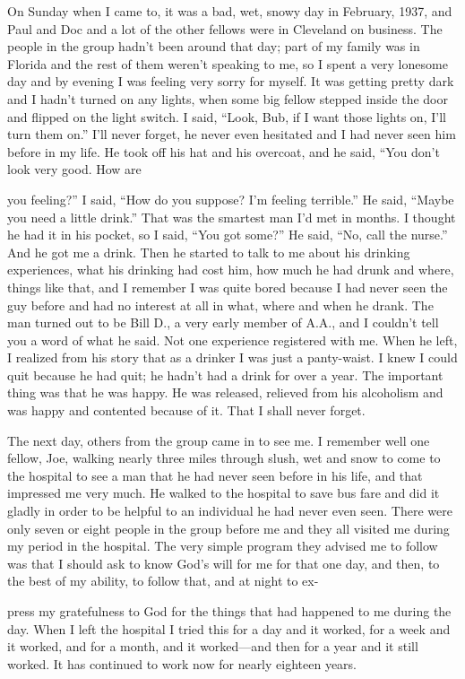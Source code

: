 \begin{biblechapter}
On Sunday when I came to, it was a bad, wet, snowy day in February, 1937, and Paul and Doc and a lot of the other fellows were in Cleveland on business. The people in the group hadn’t been around that day; part of my family was in Florida and the rest of them weren’t speaking to me, so I spent a very lonesome day and by evening I was feeling very sorry for myself. It was getting pretty dark and I hadn’t turned on any lights, when some big fellow stepped inside the door and flipped on the light switch. I said, “Look, Bub, if I want those lights on, I’ll turn them on.” I’ll never forget, he never even hesitated and I had never seen him before in my life. He took off his hat and his overcoat, and he said, “You don’t look very good. How are

you feeling?” I said, “How do you suppose? I’m feeling terrible.” He said, “Maybe you need a little drink.” That was the smartest man I’d met in months. I thought he had it in his pocket, so I said, “You got some?” He said, “No, call the nurse.” And he got me a drink. Then he started to talk to me about his drinking experiences, what his drinking had cost him, how much he had drunk and where, things like that, and I remember I was quite bored because I had never seen the guy before and had no interest at all in what, where and when he drank. The man turned out to be Bill D., a very early member of A.A., and I couldn’t tell you a word of what he said. Not one experience registered with me. When he left, I realized from his story that as a drinker I was just a panty-waist. I knew I could quit because he had quit; he hadn’t had a drink for over a year. The important thing was that he was happy. He was released, relieved from his alcoholism and was happy and contented because of it. That I shall never forget.

The next day, others from the group came in to see me. I remember well one fellow, Joe, walking nearly three miles through slush, wet and snow to come to the hospital to see a man that he had never seen before in his life, and that impressed me very much. He walked to the hospital to save bus fare and did it gladly in order to be helpful to an individual he had never even seen. There were only seven or eight people in the group before me and they all visited me during my period in the hospital. The very simple program they advised me to follow was that I should ask to know God’s will for me for that one day, and then, to the best of my ability, to follow that, and at night to ex-

press my gratefulness to God for the things that had happened to me during the day. When I left the hospital I tried this for a day and it worked, for a week and it worked, and for a month, and it worked—and then for a year and it still worked. It has continued to work now for nearly eighteen years.

\end{biblechapter}
